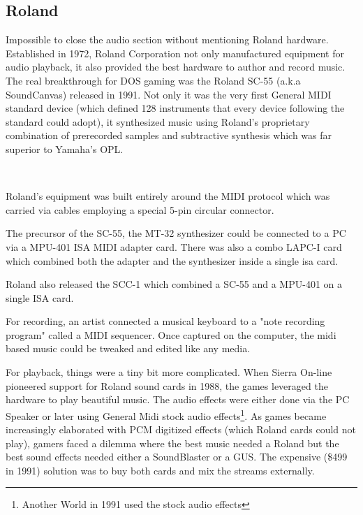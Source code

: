  \subsection{Roland}
 Impossible to close the audio section without mentioning Roland hardware. Established in 1972, Roland Corporation not only manufactured equipment for audio playback, it also provided the best hardware to author and record music. The real breakthrough for DOS gaming was the Roland SC-55 (a.k.a SoundCanvas) released in 1991. Not only it was the very first General MIDI standard device (which defined 128 instruments that every device following the standard could adopt), it synthesized music using Roland's proprietary combination of prerecorded samples and subtractive synthesis which was far superior to Yamaha's OPL.\\
 \par
 \\
 \par

Roland's equipment was built entirely around the MIDI protocol which was carried via cables employing a special 5-pin circular connector.\\
\par
 The precursor of the SC-55, the MT-32 synthesizer could be connected to a PC via a MPU-401 ISA MIDI adapter card. There was also a combo LAPC-I card which combined both the adapter and the synthesizer inside a single isa card.\\
\par 
{}
\par
Roland also released the SCC-1 which combined a SC-55 and a MPU-401 on a single ISA card.\\
\par 
{}
\par
\pagebreak
For recording, an artist connected a musical keyboard to a "note recording program" called a MIDI sequencer. Once captured on the computer, the midi based music could be tweaked and edited like any media.\\

\par
For playback, things were a tiny bit more complicated. When Sierra On-line pioneered support for Roland sound cards in 1988, the games leveraged the hardware to play beautiful music. The audio effects were either done via the PC Speaker or later using General Midi stock audio effects\footnote{Another World in 1991 used the stock audio effects}. As games became increasingly elaborated with PCM digitized effects (which Roland cards could not play), gamers faced a dilemma where the best music needed a Roland but the best sound effects needed either a SoundBlaster or a GUS. The expensive (\$499 in 1991) solution was to buy both cards and mix the streams externally.\\
\par
{}

